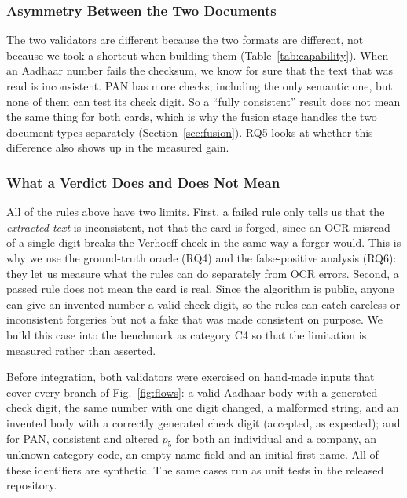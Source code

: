 \documentclass[12pt]{article}
\begin{document}

\subsubsection{Asymmetry Between the Two Documents}
\label{sec:asymmetry}

The two validators are different because the two formats are different, not because we took a shortcut when building them (Table~\ref{tab:capability}). When an Aadhaar number fails the checksum, we know for sure that the text that was read is inconsistent. PAN has more checks, including the only semantic one, but none of them can test its check digit. So a ``fully consistent'' result does not mean the same thing for both cards, which is why the fusion stage handles the two document types separately (Section~\ref{sec:fusion}). RQ5 looks at whether this difference also shows up in the measured gain.


\subsubsection{What a Verdict Does and Does Not Mean}
\label{sec:limitations}

All of the rules above have two limits. First, a failed rule only tells us that the \emph{extracted text} is inconsistent, not that the card is forged, since an OCR misread of a single digit breaks the Verhoeff check in the same way a forger would. This is why we use the ground-truth oracle (RQ4) and the false-positive analysis (RQ6): they let us measure what the rules can do separately from OCR errors. Second, a passed rule does not mean the card is real. Since the algorithm is public, anyone can give an invented number a valid check digit, so the rules can catch careless or inconsistent forgeries but not a fake that was made consistent on purpose. We build this case into the benchmark as
category C4 so that the limitation is measured rather than asserted.

Before integration, both validators were exercised on hand-made inputs
that cover every branch of Fig.~\ref{fig:flows}: a valid Aadhaar body
with a generated check digit, the same number with one digit changed,
a malformed string, and an invented body with a correctly generated
check digit (accepted, as expected); and for PAN, consistent and
altered $p_5$ for both an individual and a company, an unknown category
code, an empty name field and an initial-first name. All of these
identifiers are synthetic. The same cases run as unit tests in the
released repository.
\end{document}
